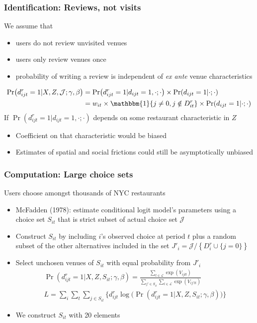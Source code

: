 \documentclass[11pt,notes=hide,aspectratio=169]{beamer}
\begin{document}
\begin{frame}
\frametitle{Identification: Reviews, not visits}
We assume that
\begin{itemize}
	\item users do not review unvisited venues
	\item users only review venues once
	\item probability of writing a review is independent of \emph{ex ante} venue characteristics
\end{itemize}
\begin{align*}
\Pr(d_{ijt}^{r}=1|X,Z,\mathcal{J};\gamma,\beta)	
&=
\Pr(d_{ijt}^{r}=1|d_{ijt}=1,\cdot;\cdot) \times \Pr(d_{ijt}=1|\cdot;\cdot)
\\
&=
w_{it} \times \mathbbm{1}\{j\neq 0,j\notin D_{it}^{r}\} \times \Pr(d_{ijt}=1|\cdot;\cdot)
\end{align*}
\pause
If $\Pr(d_{ijt}^{r}=1|d_{ijt}=1,\cdot;\cdot)$ depends on some restaurant characteristic in $Z$
\begin{itemize}
	\item Coefficient on that characteristic would be biased
	\item Estimates of spatial and social frictions could still be asymptotically unbiased
\end{itemize}
\end{frame}
\begin{frame}
\frametitle{Computation: Large choice sets}
Users choose amongst thousands of NYC restaurants
\begin{itemize}
	\item McFadden (1978): estimate conditional logit model's parameters using a choice set $S_{it}$ that is strict subset of actual choice set $\mathcal{J}$
	\item Construct $S_{it}$ by including $i$'s observed choice at period $t$ plus a random subset of the other alternatives included in the set $J'_i = \mathcal{J} / \left\{D_{i}^{r} \cup \{j=0\}\right\}$
	\item Select unchosen venues of $S_{it}$ with equal probability from $J'_i$ 
		\begin{align*}
		\Pr(d_{ijt}^{r}=1|X,Z,S_{it};\gamma,\beta)	=\frac{\sum_{l\in\mathcal{L}}\exp(V_{ijlt})}{\sum_{j'\in S_{it}}\sum_{l\in\mathcal{L}}\exp(V_{ij'lt})} \\
		L=\sum_{i}\sum_{t}\sum_{j\in S_{it}}\Big\{ d_{ijt}^{r}\log\Big(\Pr\left(d_{ijt}^{r}=1|X,Z,S_{it};\gamma,\beta\right)\Big)\Big\}	
		\end{align*}
	\item We construct $S_{it}$ with 20 elements
\end{itemize}
\hypertarget{choice_set}{}
\end{frame}
\end{document}

